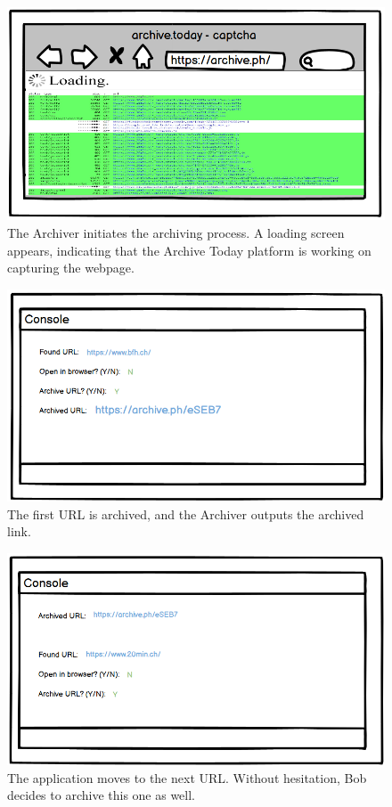 \begin{figure}[h!]
    \centering
    \includegraphics[width=1\textwidth]{pictures/Story Board/StoryBoard_4}
    \caption{The Archiver initiates the archiving process. A loading screen appears, indicating that the Archive Today platform is working on capturing the webpage.}
    \label{fig:StoryBoard_4}
\end{figure}
\begin{figure}[h!]
    \centering
    \includegraphics[width=1\textwidth]{pictures/Story Board/StoryBoard_5}
    \caption{The first URL is archived, and the Archiver outputs the archived link.}
    \label{fig:StoryBoard_5}
\end{figure}
\begin{figure}[h!]
    \centering
    \includegraphics[width=1\textwidth]{pictures/Story Board/StoryBoard_6}
    \caption{The application moves to the next URL. Without hesitation, Bob decides to archive this one as well.}
    \label{fig:StoryBoard_6}
\end{figure}

